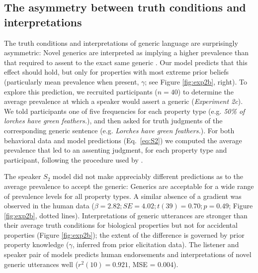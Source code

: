 \documentclass{pnastwo}
\begin{document}
\begin{article}
\subsection{The asymmetry between truth conditions and interpretations}
The truth conditions and interpretations of generic language are surprisingly asymmetric: Novel generics are interpreted as implying a higher prevalence than that required to assent to the exact same generic \cite{Cimpian2010}.
Our model predicts that this effect should hold, but only for properties with most extreme prior beliefs (particularly mean prevalence when present, $\gamma$; see Figure \ref{fig:exp2b}, right).
To explore this prediction, we recruited participants ($n=40$) to determine the average prevalence at which a speaker would assert a generic ({\it Experiment 2c}). 
We told participants one of five frequencies for each property type (e.g. \emph{50\% of lorches have green feathers.}), and then asked for truth judgments of the corresponding generic sentence (e.g. \emph{Lorches have green feathers.}). 
For both behavioral data and model predictions (Eq.~\ref{eq:S2})  we computed the average prevalence that led to an assenting judgment, for each property type and participant, following the procedure used by \cite{Cimpian2010}.
%

The speaker $S_2$ model did not make appreciably different predictions as to the average prevalence to accept the generic:
Generics are acceptable for a wide range of prevalence levels for all property types.
A similar absence of a gradient was observed in the human data ($\beta = 2.82; SE = 4.02; t(39) = 0.70; p = 0.49$; Figure \ref{fig:exp2b}, dotted lines). 
Interpretations of generic utterances are stronger than their average truth conditions for biological properties but not for accidental properties (Figure \ref{fig:exp2b}); the extent of the difference is governed by prior property knowledge ($\gamma$, inferred from prior elicitation data).
The listener and speaker pair of models predicts human endorsements and interpretations of novel generic utterances well ($r^2(10) = 0.921$, MSE = 0.004). 



\end{article}
\end{document}

